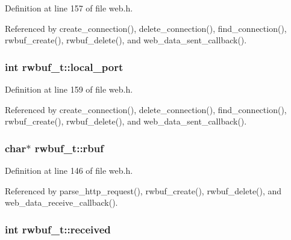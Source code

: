 Definition at line 157 of file web.\+h.



Referenced by create\+\_\+connection(), delete\+\_\+connection(), find\+\_\+connection(), rwbuf\+\_\+create(), rwbuf\+\_\+delete(), and web\+\_\+data\+\_\+sent\+\_\+callback().

\subsubsection[{\texorpdfstring{local\+\_\+port}{local_port}}]{\setlength{\rightskip}{0pt plus 5cm}int rwbuf\+\_\+t\+::local\+\_\+port}\hypertarget{structrwbuf__t_aac758cef289d022f4eb81d4c4fac7f04}{}\label{structrwbuf__t_aac758cef289d022f4eb81d4c4fac7f04}


Definition at line 159 of file web.\+h.



Referenced by create\+\_\+connection(), delete\+\_\+connection(), find\+\_\+connection(), rwbuf\+\_\+create(), rwbuf\+\_\+delete(), and web\+\_\+data\+\_\+sent\+\_\+callback().

\subsubsection[{\texorpdfstring{rbuf}{rbuf}}]{\setlength{\rightskip}{0pt plus 5cm}char$\ast$ rwbuf\+\_\+t\+::rbuf}\hypertarget{structrwbuf__t_afd83372241273849c9395d587b146021}{}\label{structrwbuf__t_afd83372241273849c9395d587b146021}


Definition at line 146 of file web.\+h.



Referenced by parse\+\_\+http\+\_\+request(), rwbuf\+\_\+create(), rwbuf\+\_\+delete(), and web\+\_\+data\+\_\+receive\+\_\+callback().

\subsubsection[{\texorpdfstring{received}{received}}]{\setlength{\rightskip}{0pt plus 5cm}int rwbuf\+\_\+t\+::received}\hypertarget{structrwbuf__t_ac76412a0fbf9dc009ae3f8bb20660883}{}\label{structrwbuf__t_ac76412a0fbf9dc009ae3f8bb20660883}



